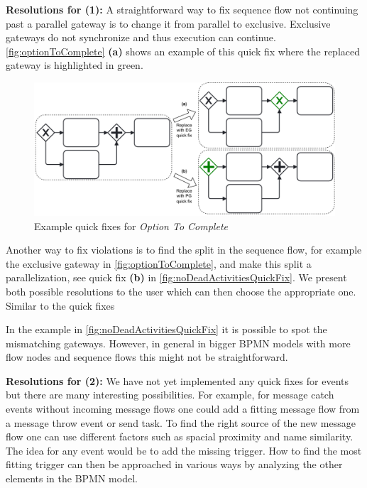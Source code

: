 \documentclass[runningheads]{llncs}
\begin{document}
\textbf{Resolutions for (1):} A straightforward way to fix sequence flow not continuing past a parallel gateway is to change it from parallel to exclusive.
Exclusive gateways do not synchronize and thus execution can continue.
\autoref{fig:optionToComplete} \textbf{(a)} shows an example of this quick fix where the replaced gateway is highlighted in green.

\begin{figure}[ht]
	\centering
	\includegraphics[width=1\textwidth]{images/optionToComplete}
	\caption{Example quick fixes for \textit{Option To Complete}}
	\label{fig:optionToComplete}
\end{figure}

Another way to fix violations is to find the split in the sequence flow, for example the exclusive gateway in \autoref{fig:optionToComplete}, and make this split a parallelization, see quick fix \textbf{(b)} in \autoref{fig:noDeadActivitiesQuickFix}.
We present both possible resolutions to the user which can then choose the appropriate one.
Similar to the quick fixes 

In the example in \autoref{fig:noDeadActivitiesQuickFix} it is possible to spot the mismatching gateways.
However, in general in bigger BPMN models with more flow nodes and sequence flows this might not be straightforward.

\textbf{Resolutions for (2):} We have not yet implemented any quick fixes for events but there are many interesting possibilities.
For example, for message catch events without incoming message flows one could add a fitting message flow from a message throw event or send task.
To find the right source of the new message flow one can use different factors such as spacial proximity and name similarity.
The idea for any event would be to add the missing trigger.
How to find the most fitting trigger can then be approached in various ways by analyzing the other elements in the BPMN model.
\end{document}
